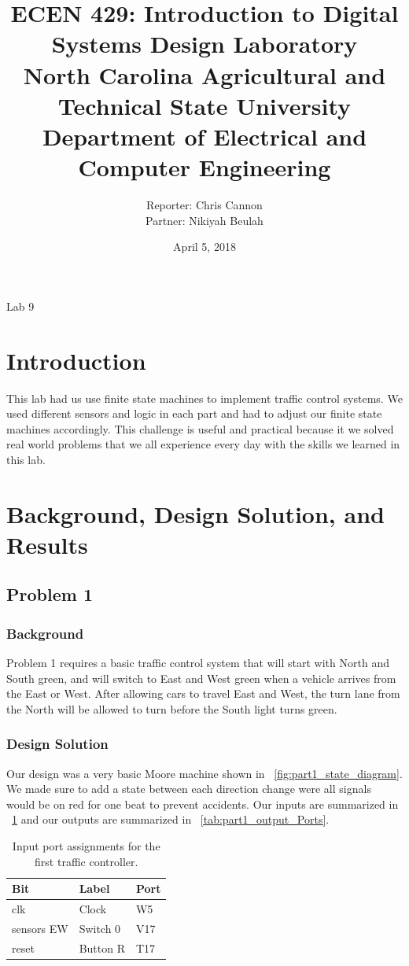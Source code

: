 \documentclass[11pt]{article}
\title {{\titleFont ECEN 429: Introduction to Digital Systems Design Laboratory \\ North Carolina Agricultural and Technical State University \\ Department of Electrical and Computer Engineering}} %
\author{\titleFont Reporter: Chris Cannon \\ \titleFont Partner: Nikiyah Beulah} %
\date{\titleFont April 5, 2018}
\begin{document}
\begin{titlingpage}
\maketitle
\begin{center}
	Lab 9
\end{center}
\end{titlingpage}

\section{Introduction}
This lab had us use finite state machines to implement traffic control systems. We used different sensors and logic in each part and had to adjust our finite state machines accordingly. This challenge is useful and practical because it we solved real world problems that we all experience every day with the skills we learned in this lab.

\section{Background, Design Solution, and Results}

\subsection{Problem 1 }

\subsubsection{Background}
Problem 1 requires a basic traffic control system that will start with North and South green, and will switch to East and West green when a vehicle arrives from the East or West. After allowing cars to travel East and West, the turn lane from the North will be allowed to turn before the South light turns green.

\subsubsection{Design Solution}
Our design was a very basic Moore machine shown in ~\ref{fig:part1_state_diagram}. We made sure to add a state between each direction change were all signals would be on red for one beat to prevent accidents. Our inputs are summarized in ~\ref{tab:part1_input_Ports} and our outputs are summarized in ~\ref{tab:part1_output_Ports}.

\begin{table}[H]
\begin{center}
\begin{tabular}{| l | l | l |}
	\hline
	Bit & Label & Port \\ \hline
	clk & Clock & W5 \\ \hline
	sensors EW & Switch 0 & V17 \\ \hline
	reset & Button R & T17 \\ \hline
\end{tabular}
\caption{\label{tab:part1_input_Ports}Input port assignments for  the first traffic controller.}
\end{center}
\end{table}
\end{document}
